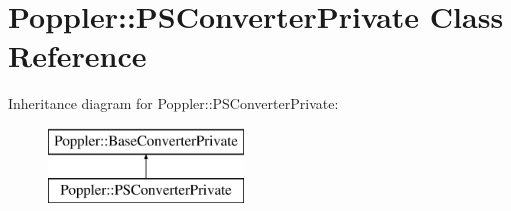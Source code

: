\hypertarget{class_poppler_1_1_p_s_converter_private}{}\section{Poppler\+:\+:P\+S\+Converter\+Private Class Reference}
\label{class_poppler_1_1_p_s_converter_private}
Inheritance diagram for Poppler\+:\+:P\+S\+Converter\+Private\+:\begin{figure}[H]
\begin{center}
\leavevmode
\includegraphics[height=2.000000cm]{class_poppler_1_1_p_s_converter_private}
\end{center}
\end{figure}
